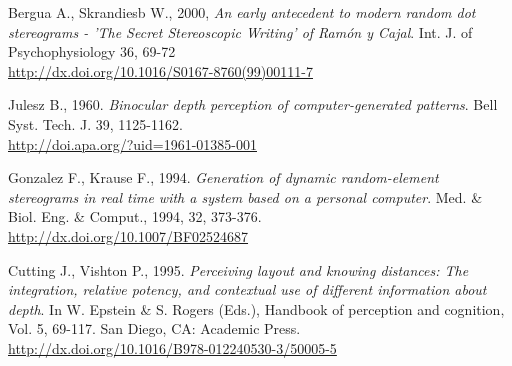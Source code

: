 \begin{thebibliography}{12}
Bergua A., Skrandiesb W., 2000,
\textit{An early antecedent to modern random dot stereograms - 'The Secret Stereoscopic Writing' of Ram\'on y Cajal}.
Int. J. of Psychophysiology 36, 69-72\\
\url{http://dx.doi.org/10.1016/S0167-8760(99)00111-7}

Julesz B., 1960.
\textit{Binocular depth perception of computer-generated patterns}.
Bell Syst. Tech. J. 39, 1125-1162.\\
\url{http://doi.apa.org/?uid=1961-01385-001}

Gonzalez F., Krause F., 1994.
\textit{Generation of dynamic random-element stereograms in real time with a system based on a personal computer}.
Med. \& Biol. Eng. \& Comput., 1994, 32, 373-376.\\
\url{http://dx.doi.org/10.1007/BF02524687}

Cutting J., Vishton P., 1995.
\textit{Perceiving layout and knowing distances: The integration, relative potency, and contextual use of different information about depth}.
In W. Epstein \& S. Rogers (Eds.), Handbook of perception and cognition, Vol. 5, 69-117. San Diego, CA: Academic Press.\\
\url{http://dx.doi.org/10.1016/B978-012240530-3/50005-5}

\end{thebibliography}

\renewcommand*\refname{Links}

